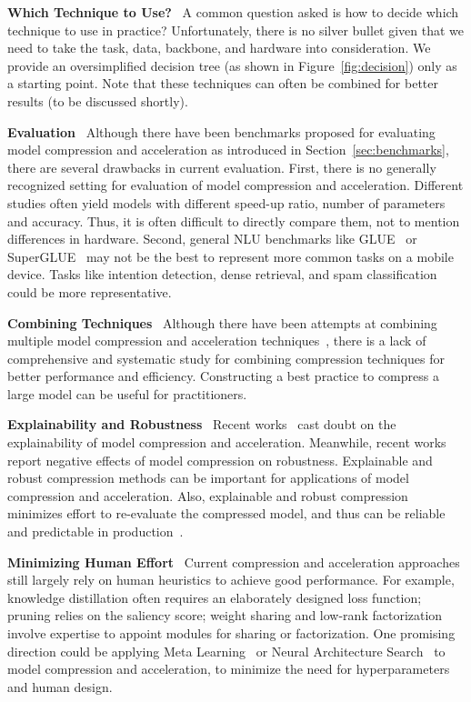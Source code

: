 \documentclass[letterpaper]{article} %
\newcommand{\paratitle}[1]{\noindent\textbf{#1}\ }
\begin{document}
\paratitle{Which Technique to Use?} A common question asked is how to decide which technique to use in practice? Unfortunately, there is no silver bullet given  that we need to take the task, data, backbone,
and
hardware
into consideration. We provide an oversimplified decision tree (as shown in Figure~\ref{fig:decision}) only as a starting point.
Note that these techniques can often be combined for better results (to be discussed shortly).

\paratitle{Evaluation} Although there have been benchmarks proposed for evaluating model compression and acceleration as introduced in Section~\ref{sec:benchmarks}, there are several drawbacks in current evaluation. First, there is no generally recognized setting for evaluation of model compression and acceleration. Different studies often yield models with different speed-up ratio, number of parameters and accuracy. Thus, it is often difficult to directly compare them, not to mention differences in hardware. Second, general NLU benchmarks like GLUE~\citep{glue} or SuperGLUE~\citep{superglue} may not be the best to represent more common tasks on a mobile device. Tasks like intention detection, dense retrieval, and spam classification could be more representative.

\paratitle{Combining Techniques} Although there have been attempts at combining multiple model compression and acceleration techniques~\citep{kim2020fastformers,sanh2020movement,xu2021beyond}, there is a lack of comprehensive and systematic study for combining compression techniques for better performance and efficiency. Constructing a best practice to compress a large model can be useful for practitioners.

\paratitle{Explainability and Robustness} Recent works~\citep{stanton2021does,xu2021beyond} cast doubt on the explainability of model compression and acceleration. Meanwhile, recent works~\citep{du2021compressed,xu2021beyond} report negative effects of model compression on robustness. Explainable and robust compression methods can be important for applications of model compression and acceleration. Also, explainable and robust compression minimizes effort to re-evaluate the compressed model, and thus can be reliable and predictable in production~\citep{stanton2021does,xu2021beyond}.

\paratitle{Minimizing Human Effort} Current compression and acceleration approaches still largely rely on human heuristics to achieve good performance. For example, knowledge distillation often requires an elaborately designed loss function; pruning relies on the saliency score; weight sharing and low-rank factorization involve expertise to appoint modules for sharing or factorization. One promising direction could be applying Meta Learning~\citep{maml} or Neural Architecture Search~\citep{darts} to model compression and acceleration, to minimize the need for hyperparameters and human design.
\end{document}
